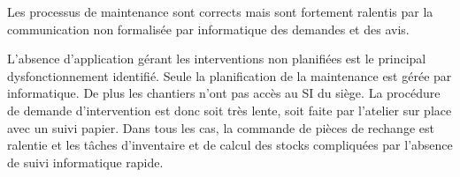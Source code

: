 Les processus de maintenance sont corrects mais sont fortement ralentis par
la communication non formalisée par informatique des demandes et des avis.

L'absence d'application gérant les interventions non planifiées est le
principal dysfonctionnement identifié. Seule la planification de la
maintenance est gérée par informatique. De plus les chantiers n'ont pas
accès au SI du siège. La procédure de demande d'intervention est donc soit
très lente, soit faite par l'atelier sur place avec un suivi papier. Dans
tous les cas, la commande de pièces de rechange est ralentie et les tâches
d'inventaire et de calcul des stocks compliquées par l'absence de suivi
informatique rapide.

\vfil
\pagebreak
